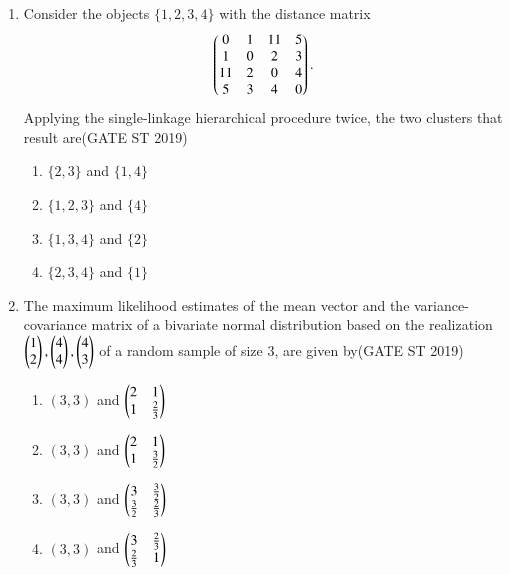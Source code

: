 \documentclass[journal]{IEEEtran}
\begin{document}
\begin{enumerate}[start=1]
\item Consider the objects \(\{1,2,3,4\}\) with the distance matrix
\begin{align*}
\begin{pmatrix}0 & 1 & 11 & 5 \\
1 & 0 & 2 & 3 \\
11 & 2 & 0 & 4 \\
5 & 3 & 4 & 0\end{pmatrix}.
\end{align*}
Applying the single-linkage hierarchical procedure twice, the two clusters that result are\hfill(GATE ST 2019)
\begin{multicols}{2}
\begin{enumerate}
\item \(\{2,3\}\) and \(\{1,4\}\)
\item \(\{1,2,3\}\) and \(\{4\}\)
\item \(\{1,3,4\}\) and \(\{2\}\)
\item \(\{2,3,4\}\) and \(\{1\}\)
\end{enumerate}
\end{multicols}

\item The maximum likelihood estimates of the mean vector and the variance-covariance matrix of a bivariate normal distribution based on the realization \(\begin{pmatrix}1 \\ 2\end{pmatrix},\begin{pmatrix}4 \\ 4\end{pmatrix},\begin{pmatrix}4 \\ 3\end{pmatrix}\) of a random sample of size 3, are given by\hfill(GATE ST 2019)
\begin{multicols}{2}
\begin{enumerate}
\item \((3,3)\) and \(\begin{pmatrix} 2 & 1 \\ 1 & \frac{2}{3}\end{pmatrix}\)
\item \((3,3)\) and \(\begin{pmatrix} 2 & 1 \\ 1 & \frac{3}{2}\end{pmatrix}\)
\item \((3,3)\) and \(\begin{pmatrix} 3 & \frac{3}{2} \\ \frac{3}{2} & \frac{2}{3}\end{pmatrix}\)
\item \((3,3)\) and \(\begin{pmatrix} 3 & \frac{2}{3} \\ \frac{2}{3} & 1\end{pmatrix}\)
\end{enumerate}
\end{multicols}


\end{enumerate}
\end{document}
